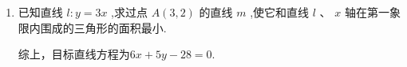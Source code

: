 \begin{enumerate}
\begin{jieda}
\begin{enumerate}
            故直线方程为$x+2y-4=0$
            \item 设$l: y = k(x-a)+b$（$k < 0$），$N(0, b-ak), M\left(a-\dfrac{b}{k}, 0\right)$，故$S = \dfrac{1}{2}(b-ak)\left(a-\dfrac{b}{k}\right) = \dfrac{2ab-a^2k-\dfrac{b^2}{k}}{2} \geq 2ab$，当且仅当$k = -\dfrac{b}{a}$时取得最值，此时$M(2a, 0), N(0, 2b)$，$P$为$AB$中点.
        \end{enumerate}
    \end{jieda}
    \item 已知直线 $l : y = {3x}$ ,求过点 $A\left( {3,2}\right)$ 的直线 $m$ ,使它和直线 $l$ 、 $x$ 轴在第一象限内围成的三角形的面积最小.
    \begin{jieda}
        

        综上，目标直线方程为$6x+5y-28=0$.
    \end{jieda}

\end{enumerate}

\clearpage
